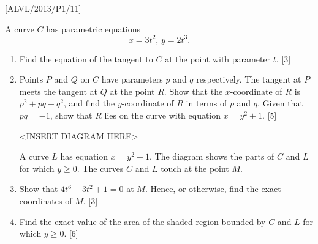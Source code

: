\item {[}ALVL/2013/P1/11{]}

A curve $C$ has parametric equations 
\[
x=3t^{2},\,y=2t^{3}.
\]

\begin{enumerate}
\item Find the equation of the tangent to $C$ at the point with parameter
$t$. \hfill{} {[}3{]}
\item Points $P$ and $Q$ on $C$ have parameters $p$ and $q$ respectively.
The tangent at $P$ meets the tangent at $Q$ at the point $R$. Show
that the $x$-coordinate of $R$ is $p^{2}+pq+q^{2}$, and find the
$y$-coordinate of $R$ in terms of $p$ and $q$. Given that $pq=-1$,
show that $R$ lies on the curve with equation $x=y^{2}+1$. \hfill{}{[}5{]}
\noindent \begin{center}
<INSERT DIAGRAM HERE>
\par\end{center}

A curve $L$ has equation $x=y^{2}+1$. The diagram shows the parts
of $C$ and $L$ for which $y\geq0$. The curves $C$ and $L$ touch
at the point $M$. 
\item Show that $4t^{6}-3t^{2}+1=0$ at $M$. Hence, or otherwise, find
the exact coordinates of $M$. \hfill{}{[}3{]}
\item Find the exact value of the area of the shaded region bounded by $C$
and $L$ for which $y\geq0$. \hfill{}{[}6{]}
\end{enumerate}
